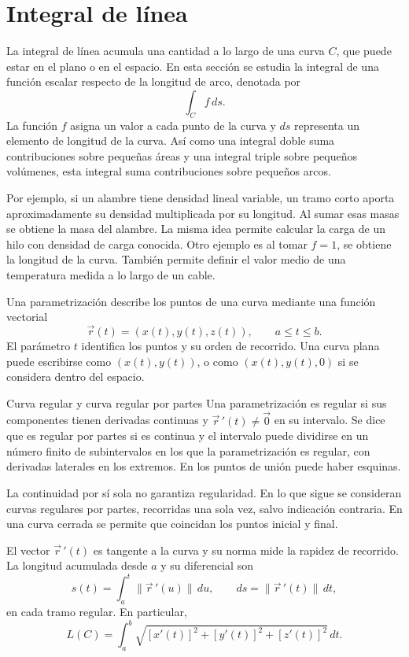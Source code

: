 \section{Integral de línea}

La integral de línea acumula una cantidad a lo largo de una curva $C$, que puede estar en el plano o en el espacio. En esta sección se estudia la integral de una función escalar respecto de la longitud de arco, denotada por
\[
\int_C f\,ds.
\]
La función $f$ asigna un valor a cada punto de la curva y $ds$ representa un elemento de longitud de la curva. Así como una integral doble suma contribuciones sobre pequeñas áreas y una integral triple sobre pequeños volúmenes, esta integral suma contribuciones sobre pequeños arcos.

Por ejemplo, si un alambre tiene densidad lineal variable, un tramo corto aporta aproximadamente su densidad multiplicada por su longitud. Al sumar esas masas se obtiene la masa del alambre. La misma idea permite calcular la carga de un hilo con densidad de carga conocida. Otro ejemplo es al tomar $f=1$, se obtiene la longitud de la curva. También permite definir el valor medio de una temperatura medida a lo largo de un cable.

Una parametrización describe los puntos de una curva mediante una función vectorial
\[
\vec r(t)=(x(t),y(t),z(t)),\qquad a\leq t\leq b.
\]
El parámetro $t$ identifica los puntos y su orden de recorrido. Una curva plana puede escribirse como $(x(t),y(t))$, o como $(x(t),y(t),0)$ si se considera dentro del espacio.

\begin{mydefinition}{Curva regular y curva regular por partes}
Una parametrización es regular si sus componentes tienen derivadas continuas y $\vec r\,'(t)\neq\vec 0$ en su intervalo. Se dice que es regular por partes si es continua y el intervalo puede dividirse en un número finito de subintervalos en los que la parametrización es regular, con derivadas laterales en los extremos. En los puntos de unión puede haber esquinas.
\end{mydefinition}

La continuidad por sí sola no garantiza regularidad. En lo que sigue se consideran curvas regulares por partes, recorridas una sola vez, salvo indicación contraria. En una curva cerrada se permite que coincidan los puntos inicial y final.

El vector $\vec r\,'(t)$ es tangente a la curva y su norma mide la rapidez de recorrido. La longitud acumulada desde $a$ y su diferencial son
\[
s(t)=\int_a^t\|\vec r\,'(u)\|\,du,
\qquad ds=\|\vec r\,'(t)\|\,dt,
\]
en cada tramo regular. En particular,
\[
L(C)=\int_a^b\sqrt{[x'(t)]^2+[y'(t)]^2+[z'(t)]^2}\,dt.
\]

